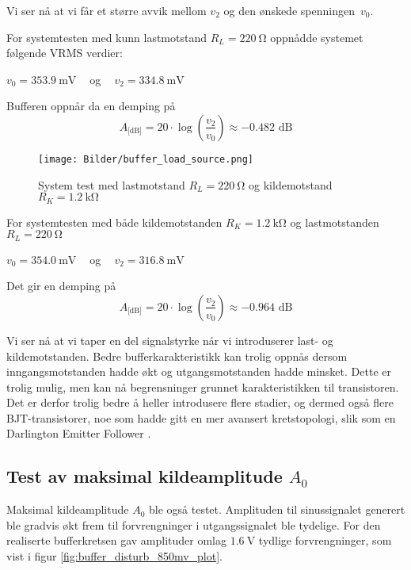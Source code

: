 Vi ser nå at vi får et større avvik mellom $v_2$ og den ønskede spenningen $v_0$. 

For systemtesten med kunn lastmotstand $R_L = \SI{220}{\ohm}$ oppnådde systemet følgende VRMS verdier:
\begin{center}
    $v_0 = \SI{353.9}{\milli\volt}\:\:\:\:$ og $\:\:\:\:v_2 = \SI{334.8}{\milli\volt}$ 
\end{center}

Bufferen oppnår da en demping på 
\[
    A_\text{[dB]} = 20 \cdot \log{\left(\frac{v_2}{v_0}\right)} \approx -0.482 \text{ dB}
\]

\begin{figure}[H]
    \centering 
    \texttt{[image: Bilder/buffer\_load\_source.png]}
    \caption{System test med lastmotstand $R_L = \SI{220}{\ohm}$ og kildemotstand $R_K = \SI{1.2}{\kilo\ohm}$}
    \label{fig:buffer_load_source_res_plot}
\end{figure}

For systemtesten med både kildemotstanden $R_K = \SI{1.2}{\kilo\ohm}$ og
lastmotstanden $R_L = \SI{220}{\ohm}$

\begin{center}
    $v_0 = \SI{354.0}{\milli\volt}\:\:\:\:$ og $\:\:\:\:v_2 = \SI{316.8}{\milli\volt}$ 
\end{center}

Det gir en demping på
\[
    A_\text{[dB]} = 20 \cdot \log{\left(\frac{v_2}{v_0}\right)} \approx -0.964 \text{ dB}
\]

Vi ser nå at vi taper en del signalstyrke når vi introduserer last- og kildemotstanden. Bedre 
bufferkarakteristikk kan trolig oppnås dersom inngangsmotstanden hadde økt og utgangsmotstanden hadde 
minsket. Dette er trolig mulig, men kan nå begrensninger grunnet karakteristikken til transistoren.
Det er derfor trolig bedre å heller introdusere flere stadier, og dermed også flere BJT-transistorer, noe som 
hadde gitt en mer avansert kretstopologi, slik som en Darlington Emitter Follower \cite{darlington}.

\subsection{Test av maksimal kildeamplitude $A_0$}
Maksimal kildeamplitude $A_0$ ble også testet. Amplituden til sinussignalet generert ble gradvis økt frem til 
forvrengninger i utgangssignalet ble tydelige. For den realiserte bufferkretsen gav amplituder omlag $\SI{1.6}{\volt}$ 
tydlige forvrengninger, som vist i figur \ref{fig:buffer_disturb_850mv_plot}.

